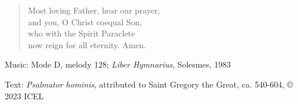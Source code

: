 \hymn



\setlength{\leftmargini}{2em}
\begin{verse}
  Most loving Father, hear our prayer,\\
  and you, O Christ coequal Son,\\
  who with the Spirit Paraclete\\
  now reign for all eternity. Amen.
\end{verse}
\setlength{\leftmargini}{\defleftmargini}

\begin{hymnsource}
Music: Mode D, melody 128; \emph{Liber Hymnarius}, Solesmes, 1983

Text: \emph{Psalmator hominis}, attributed to Saint Gregory the Great, ca. 540-604, © 2023 ICEL
\end{hymnsource}
